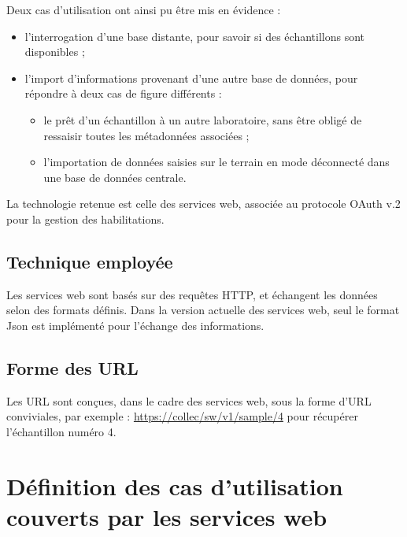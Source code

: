 Deux cas d'utilisation ont ainsi pu être mis en évidence :
\begin{itemize}
\item l'interrogation d'une base distante, pour savoir si des échantillons sont disponibles ;
\item l'import d'informations provenant d'une autre base de données, pour ré\-pondre à deux cas de figure différents :
\begin{itemize}
\item le prêt d'un échantillon à un autre laboratoire, sans être obligé de ressaisir toutes les métadonnées associées ;
\item l'importation de données saisies sur le terrain en mode déconnecté dans une base de données centrale.
\end{itemize}
\end{itemize}

La technologie retenue est celle des services web, associée au protocole OAuth v.2 pour la gestion des habilitations.

\subsection{Technique employée}

Les services web sont basés sur des requêtes HTTP, et échangent les données selon des formats définis. Dans la version actuelle des services web, seul le format Json est implémenté pour l'échange des informations.

\subsection{Forme des URL}
Les URL sont conçues, dans le cadre des services web, sous la forme d'URL conviviales, par exemple : \url{https://collec/sw/v1/sample/4} pour récupérer l'échan\-tillon numéro 4.

\section{Définition des cas d'utilisation couverts par les services web}

